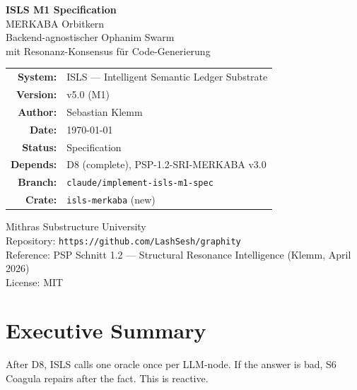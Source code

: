 \documentclass[11pt,a4paper]{article}
\begin{document}
\begin{titlepage}
\centering
\vspace*{2.5cm}

{\Huge\bfseries\color{isls-blue} ISLS M1 Specification}\\[0.5cm]
{\LARGE\color{isls-orange} MERKABA Orbitkern}\\[0.3cm]
{\large\color{isls-gray} Backend-agnostischer Ophanim Swarm\\
mit Resonanz-Konsensus f\"ur Code-Generierung}\\[2cm]

{\large
\begin{tabular}{rl}
\textbf{System:}       & ISLS --- Intelligent Semantic Ledger Substrate \\
\textbf{Version:}      & v5.0 (M1) \\
\textbf{Author:}       & Sebastian Klemm \\
\textbf{Date:}         & \today \\
\textbf{Status:}       & Specification \\
\textbf{Depends:}      & D8 (complete), PSP-1.2-SRI-MERKABA v3.0 \\
\textbf{Branch:}       & \texttt{claude/implement-isls-m1-spec} \\
\textbf{Crate:}        & \texttt{isls-merkaba} (new) \\
\end{tabular}
}

\vfill

{\small\color{isls-gray}
Mithras Substructure University\\
Repository: \texttt{https://github.com/LashSesh/graphity}\\
Reference: PSP Schnitt 1.2 --- Structural Resonance Intelligence (Klemm, April 2026)\\
License: MIT
}
\end{titlepage}

\tableofcontents
\newpage


\section{Executive Summary}

After D8, ISLS calls one oracle once per LLM-node. If the answer is 
bad, S6 Coagula repairs after the fact. This is reactive.
\end{document}
